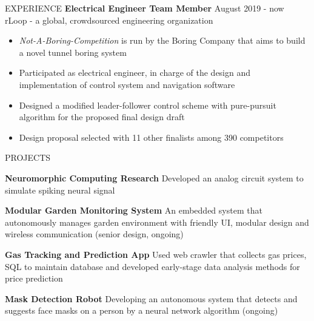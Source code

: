 \documentclass{../lib/resume} %
\begin{document}
\begin{rSection}{EXPERIENCE}
    \textbf{Electrical Engineer Team Member} \hfill August 2019 - now
    \\	rLoop - a global, crowdsourced engineering organization \hfill \textit{}
    \begin{itemize}
        \itemsep -4pt {}
        \item \textit{Not-A-Boring-Competition} is run by the Boring Company that aims to build a novel tunnel boring system
        \item Participated as electrical engineer, in charge of the design and implementation of control system and navigation software
        \item Designed a modified leader-follower control scheme with pure-pursuit algorithm for the proposed final design draft
        \item Design proposal selected with 11 other finalists among 390 competitors
    \end{itemize}



\end{rSection}


\begin{rSection}{PROJECTS}
    \vspace{-1em}

    \item \textbf{Neuromorphic Computing Research} {Developed an analog circuit system to simulate spiking neural signal}

    \item \textbf{Modular Garden Monitoring System} {An embedded system that autonomously manages garden environment with friendly UI, modular design and wireless communication (senior design, ongoing)}

    \item \textbf{Gas Tracking and Prediction App} {Used web crawler that collects gas prices, SQL to maintain database and developed early-stage data analysis methods for price prediction}

    \item \textbf{Mask Detection Robot} {Developing an autonomous system that detects and suggests face masks on a person by a neural network algorithm (ongoing)}


\end{rSection}
\end{document}
